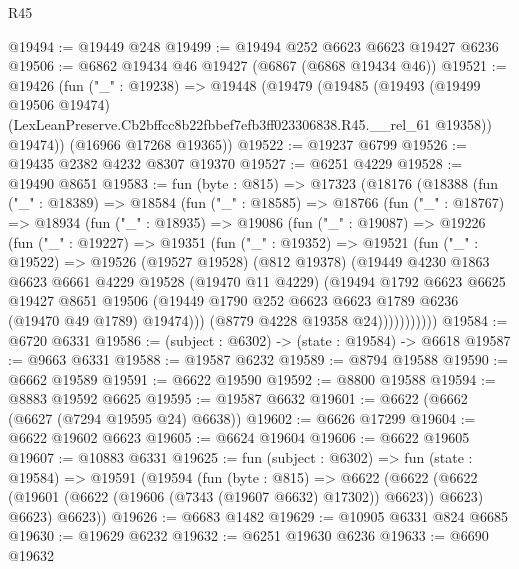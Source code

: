 \begin{lexlean}{R45}
\begin{coremodule}
{@19494 := @19449 @248
@19499 := @19494 @252 @6623 @6623 @19427 @6236
@19506 := @6862 @19434 @46 @19427 (@6867 (@6868 @19434 @46))
@19521 := @19426
    (fun ("_" : @19238) =>
    @19448
      (@19479
        (@19485
          (@19493
            (@19499 @19506 @19474)
            (LexLeanPreserve.Cb2bffcc8b22fbbef7efb3ff023306838.R45.__rel_61 @19358))
          @19474))
      (@16966 @17268 @19365))
@19522 := @19237 @6799
@19526 := @19435 @2382 @4232 @8307 @19370
@19527 := @6251 @4229
@19528 := @19490 @8651
@19583 := fun (byte : @815) =>
  @17323
    (@18176
      (@18388
        (fun ("_" : @18389) =>
        @18584
          (fun ("_" : @18585) =>
          @18766
            (fun ("_" : @18767) =>
            @18934
              (fun ("_" : @18935) =>
              @19086
                (fun ("_" : @19087) =>
                @19226
                  (fun ("_" : @19227) =>
                  @19351
                    (fun ("_" : @19352) =>
                    @19521
                      (fun ("_" : @19522) =>
                      @19526
                        (@19527 @19528)
                        (@812 @19378)
                        (@19449
                          @4230
                          @1863
                          @6623
                          @6661
                          @4229
                          @19528
                          (@19470 @11 @4229)
                          (@19494
                            @1792
                            @6623
                            @6625
                            @19427
                            @8651
                            @19506
                            (@19449 @1790 @252 @6623 @6623 @1789 @6236 (@19470 @49 @1789) @19474)))
                        (@8779 @4228 @19358 @24)))))))))))
@19584 := @6720 @6331
@19586 := (subject : @6302) -> (state : @19584) -> @6618
@19587 := @9663 @6331
@19588 := @19587 @6232
@19589 := @8794 @19588
@19590 := @6662 @19589
@19591 := @6622 @19590
@19592 := @8800 @19588
@19594 := @8883 @19592 @6625
@19595 := @19587 @6632
@19601 := @6622 (@6662 (@6627 (@7294 @19595 @24) @6638))
@19602 := @6626 @17299
@19604 := @6622 @19602 @6623
@19605 := @6624 @19604
@19606 := @6622 @19605
@19607 := @10883 @6331
@19625 := fun (subject : @6302) =>
  fun (state : @19584) =>
  @19591
    (@19594
      (fun (byte : @815) =>
      @6622
        (@6622 (@6622 (@19601 (@6622 (@19606 (@7343 (@19607 @6632) @17302)) @6623)) @6623) @6623)
        @6623))
@19626 := @6683 @1482
@19629 := @10905 @6331 @824 @6685
@19630 := @19629 @6232
@19632 := @6251 @19630 @6236
@19633 := @6690 @19632
}
\end{coremodule}
\end{lexlean}
